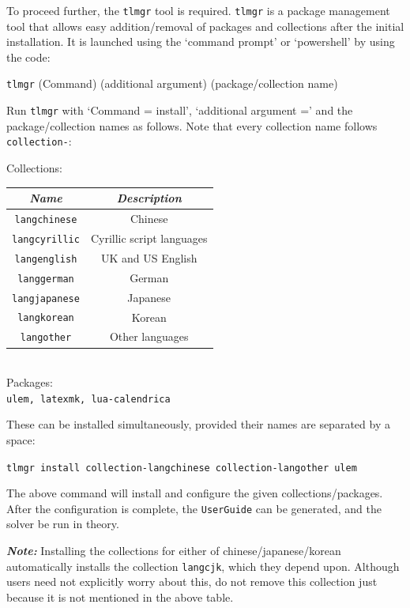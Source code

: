 \documentclass[12pt,letterpaper]{article}
\newenvironment{example}{\def\FrameCommand{\colorbox{sampler}} \MakeFramed{\advance\hsize+\width}\begin{center}}{\end{center}\endMakeFramed}
\newenvironment{syntax}{\def\FrameCommand{\colorbox{ruler}} \MakeFramed{\advance\hsize+\width}\begin{center}}{\end{center}\endMakeFramed}
\newenvironment{setdef}{\def\FrameCommand{\colorbox{mathset}} \MakeFramed{\advance\hsize+\width}\begin{center}}{\end{center}\endMakeFramed}
\begin{document}
To proceed further, the \texttt{tlmgr} tool is required. \texttt{tlmgr} is a package management tool that allows  easy addition/removal of packages and collections after the initial installation. It is launched using the `command prompt' or `powershell' by using the code:
\begin{syntax}
    \texttt{tlmgr} (Command) (additional argument) (package/collection name)
\end{syntax}
Run \texttt{tlmgr} with `Command = install', `additional argument =' and the package/collection names as follows. Note that every collection name follows \texttt{collection-}:
\begin{setdef}
    Collections:\\
    \begin{tabular}{c|c}
        \hline\textit{Name}& \textit{Description}\\\hline
        \texttt{langchinese} & Chinese\\\hline
        \texttt{langcyrillic} & Cyrillic script languages\\\hline
        \texttt{langenglish} & UK and US English\\\hline
        \texttt{langgerman} & German \\\hline
        \texttt{langjapanese} & Japanese\\\hline
        \texttt{langkorean} & Korean\\\hline
        \texttt{langother} & Other languages\\\hline
    \end{tabular}\\ Packages:\\ 
        \texttt{ulem, latexmk, lua-calendrica}
\end{setdef}
These can  be installed simultaneously, provided their names are separated by a space:
\begin{example}
    \texttt{tlmgr install collection-langchinese collection-langother ulem}
\end{example}
The above command will install and configure the given collections/packages. After the configuration is complete, the \texttt{UserGuide} can be generated, and the solver  be run in theory.

\textit{\textbf{Note:}} Installing the  collections for either of chinese/japanese/korean automatically installs the collection \texttt{langcjk}, which they depend upon. Although users need not explicitly worry about this, do not remove this collection just because it is not mentioned in the above table.
\end{document}
